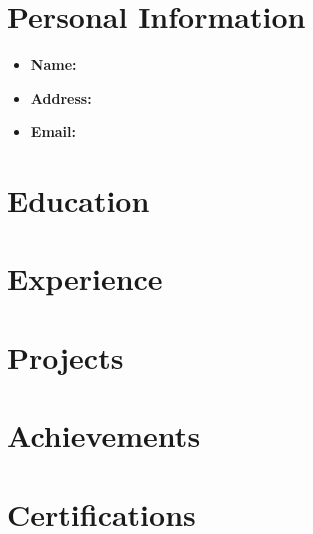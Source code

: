\documentclass[a4paper,10pt]{article}
\begin{document}
\section*{Personal Information}
\begin{itemize}
    \item \textbf{Name:} 
    \item \textbf{Address:} 
    \item \textbf{Email:} \href{mailto:\VAR{personal_information.email}}{}
\end{itemize}

\section*{Education}
\begin{itemize}
\end{itemize}

\section*{Experience}
\begin{itemize}
\end{itemize}

\section*{Projects}
\begin{itemize}
\end{itemize}

\section*{Achievements}
\begin{itemize}
\end{itemize}

\section*{Certifications}
\begin{itemize}
\end{itemize}
\end{document}
